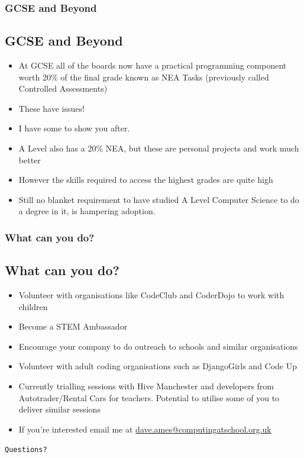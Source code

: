 \documentclass{beamer}
\begin{document}
\begin{frame}
\frametitle{GCSE and Beyond}
\subsection{GCSE and Beyond}
\begin{itemize}
  \item At GCSE all of the boards now have a practical programming component worth 20\% of the final grade known as NEA
    Tasks (previously called Controlled Assessments)
    
  \item These have issues!
    
  \item I have some to show you after.
    
  \item A Level also has a 20\% NEA, but these are personal projects and work much better
    
  \item However the skills required to access the highest grades are quite high
    
  \item Still no blanket requirement to have studied A Level Computer Science to do a degree in it, is hampering
    adoption.   
\end{itemize}

\end{frame}


\begin{frame}
\frametitle{What can you do?}
\subsection{What can you do?}
\begin{itemize}
\item Volunteer with organisations like CodeClub and CoderDojo to work with children
  
\item Become a STEM Ambassador
  
\item Encourage your company to do outreach to schools and similar organisations
  
\item Volunteer with adult coding organisations such as DjangoGirls and Code Up
  
\item Currently trialling sessions with Hive Manchester and developers from Autotrader/Rental Cars for
  teachers. Potential to utilise some of you to deliver similar sessions
\item If you're interested email me at \url{dave.ames@computingatschool.org.uk}
\end{itemize}

\end{frame}

  
\begin{frame}
\begin{center}
\begin{huge}
  \texttt{Questions?}
\end{huge}
\end{center}
\normalfont
\end{frame}
  
\end{document}
